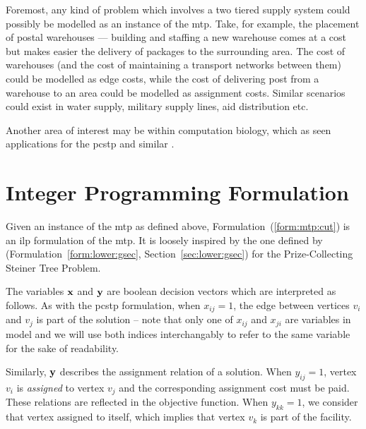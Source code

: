  Foremost, any kind of problem which involves a two tiered supply system could possibly be modelled as an instance of the
 \gls{mtp}. Take, for example, the placement of postal warehouses --- building and staffing a new warehouse comes at
 a cost but makes easier the delivery of packages to the surrounding area. The cost of warehouses (and the cost of maintaining
 a transport networks between them) could be modelled as edge costs, while the cost of delivering post from a warehouse to an area
 could be modelled as assignment costs.  Similar scenarios could exist in water supply, military supply lines, aid distribution etc.

 Another area of interest may be within computation biology, which as seen applications for the \gls{pcstp} and similar
 \citep{sun2018classical, akhmedov2016divide}.
\section{Integer Programming Formulation}

Given an instance of the \gls{mtp} as defined above,
Formulation~(\ref{form:mtp:cut}) is an \gls{ilp} formulation of the \gls{mtp}.
It is loosely inspired by the one defined by \citet{lucena2004strong}
(Formulation~\ref{form:lower:gsec}, Section~\ref{sec:lower:gsec}) for the Prize-Collecting
Steiner Tree Problem.

The variables $\mathbf{x}$ and $\mathbf{y}$ are boolean
decision vectors which are interpreted as follows.
As with the \gls{pcstp} formulation, when $x_{ij} = 1$,
the edge between vertices $v_i$ and $v_j$ is part of the solution -- note that only
one of $x_{ij}$ and $x_{ji}$ are variables in model and we will use both indices interchangably
to refer to the same variable for the sake of readability.

Similarly, $\mathbf{y}$ describes the assignment relation of a solution. When
$y_{ij} = 1$, vertex $v_i$ is \textit{assigned} to vertex $v_j$ and the corresponding
assignment cost must be paid.
These relations are reflected in the objective function.
When $y_{kk} = 1$, we consider that vertex assigned to
itself, which implies that vertex $v_k$ is part of the facility.

